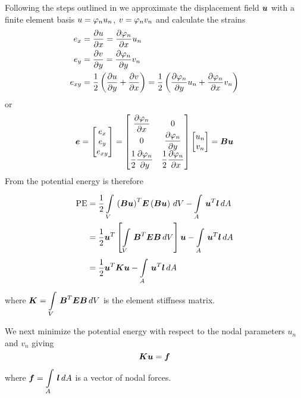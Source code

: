 Following the steps outlined in  we approximate the
displacement field $\vect{u}$ with a finite element basis $u= \varphi_{n}  u_{n}$,
$v= \varphi_{n}  v_{n}$ and calculate the strains
\begin{gather}
  \begin{aligned}
    e_{x} &=  \dfrac{\partial u}{\partial x}  =  \dfrac{\partial  \varphi_{n} }{\partial x}  u_{n} \\
    e_{y} &=  \dfrac{\partial v}{\partial y}  =  \dfrac{\partial  \varphi_{n} }{\partial y}  v_{n} \\
    e_{xy} &= \dfrac{1}{2}\left(  \dfrac{\partial u}{\partial y} +  \dfrac{\partial v}{\partial x}  \right) = 
    \dfrac{1}{2} \left(  \dfrac{\partial  \varphi_{n} }{\partial y} u_{n} + 
       \dfrac{\partial  \varphi_{n} }{\partial x} v_{n} \right)
  \end{aligned}
  \label{eqn:strains}
\end{gather}
or
\begin{equation}
  \vect{e} = \begin{bmatrix}
    e_{x} \\
    e_{y} \\
    e_{xy}
    \end{bmatrix} = \begin{bmatrix}
      \delby{\lbfnsymb{n}}{x} & 0 \\
      0 & \delby{\lbfnsymb{n}}{y} \\
      \dfrac{1}{2}\delby{\lbfnsymb{n}}{y} & \dfrac{1}{2}\delby{\lbfnsymb{n}}{x}
  \end{bmatrix} \begin{bmatrix}
    u_{n} \\
    v_{n} 
  \end{bmatrix} = \matr{B}\vect{u}
  \label{eqn:orstr}
\end{equation}
From  the potential energy is therefore
\begin{align*}
  \text{PE} &= \dfrac{1}{2}
  \goneint{\transpose{\pbrac{\matr{B}\vect{u}}}\matr{E}\pbrac{\matr{B}\vect{u}}}{V} -
  \goneint{\transpose{\vect{u}}\vect{l}}{A} \\ 
  &= \dfrac{1}{2}\transpose{\vect{u}} \left[
  \goneint{\transpose{\matr{B}}\matr{E}\matr{B}}{V} \right] \vect{u} - 
  \goneint{\transpose{\vect{u}}\vect{l}}{A} \\
  &= \dfrac{1}{2} \transpose{\vect{u}}\matr{K}\vect{u}-
  \goneint{\transpose{\vect{u}}\vect{l}}{A}
\end{align*}
where $\matr{K} = \goneint{\transpose{\matr{B}}\matr{E}\matr{B}}{V}$ is the
element stiffness matrix.

We next minimize the potential energy with respect to the nodal parameters
$u_{n}$ and $v_{n}$ giving
\begin{equation}
  \matr{K}\vect{u} = \vect{f}
  \label{eqn:pennodpam}
\end{equation}
where $\vect{f} = \goneint{\vect{l}}{A}$ is a vector of nodal forces.

